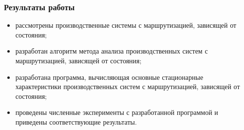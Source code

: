 
\begin{frame} \frametitle{Результаты работы}
\begin{itemize}
\item рассмотрены производственные системы с маршрутизацией, зависящей от состояния;
\item разработан алгоритм метода анализа производственных систем с маршрутизацией, зависящей от состояния;
\item разработана программа, вычисляющая основные стационарные характеристики производственных систем с маршрутизацией, зависящей от состояния;
\item проведены численные эксперименты с разработанной программой и приведены соответствующие результаты.
\end{itemize}
\end{frame}
